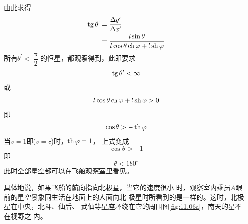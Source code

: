 由此求得
\begin{align*}
    \operatorname{tg} \theta ^ { \prime } &= \frac { \Delta y ^ { \prime } } { \Delta x ^ { \prime } }  \\
        &= \frac { l \sin \theta } { l \cos \theta \operatorname{ch} \varphi + l \operatorname{sh} \varphi }
\end{align*}
所有$ \theta ^ { \prime } < \dfrac { \uppi } { 2 } $的恒星，都观察得到，此即要求
\begin{equation*}
    \operatorname{tg} \theta ^ { \prime } < \infty
\end{equation*}
或\vspace{-1.56em}
\begin{equation*}
    l \cos \theta \operatorname{ch} \varphi + l \operatorname{sh} \varphi > 0
\end{equation*}
即
\begin{equation*}
    \cos \theta > - \operatorname{th} \varphi
\end{equation*}
当$  v = 1 $即($ v = c $)时，$  \operatorname{th} \varphi = 1   $，
上式变成
\begin{equation*}
    \cos \theta > - 1
\end{equation*}
即
\begin{equation*}
    \theta < 1 8 0 ^ { \circ }
\end{equation*}
此时全部星空都可以在飞船观察室里看见。

具体地说，如果飞船的航向指向北极星，当它的速度很小
时，观察室内乘员$ A $眼前的星空景象同生活在地面上的人面向北
极星时所看到的是一样的。这时，北极星在中央，北斗、仙后、
武仙等星座环绕在它的周围\lhbrak 图\ref{fig:11.06a}\rhbrak ，南天的星不在视野之
内。

